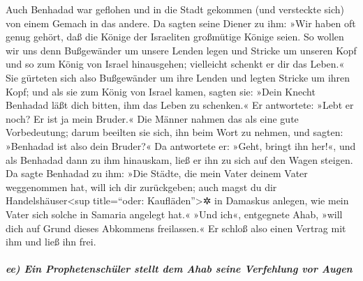 Auch Benhadad war geflohen und in die Stadt gekommen (und versteckte
sich) von einem Gemach in das andere. Da sagten seine
Diener zu ihm: »Wir haben oft genug gehört, daß die Könige der
Israeliten großmütige Könige seien. So wollen wir uns denn Bußgewänder
um unsere Lenden legen und Stricke um unseren Kopf und so zum König von
Israel hinausgehen; vielleicht schenkt er dir das Leben.«
Sie gürteten sich also Bußgewänder um ihre Lenden und
legten Stricke um ihren Kopf; und als sie zum König von Israel kamen,
sagten sie: »Dein Knecht Benhadad läßt dich bitten, ihm das Leben zu
schenken.« Er antwortete: »Lebt er noch? Er ist ja mein Bruder.«
Die Männer nahmen das als eine gute Vorbedeutung; darum
beeilten sie sich, ihn beim Wort zu nehmen, und sagten: »Benhadad ist
also dein Bruder?« Da antwortete er: »Geht, bringt ihn her!«, und als
Benhadad dann zu ihm hinauskam, ließ er ihn zu sich auf den Wagen
steigen. Da sagte Benhadad zu ihm: »Die Städte, die mein
Vater deinem Vater weggenommen hat, will ich dir zurückgeben; auch magst
du dir Handelshäuser\textless sup title=``oder: Kaufläden''\textgreater✲
in Damaskus anlegen, wie mein Vater sich solche in Samaria angelegt
hat.« »Und ich«, entgegnete Ahab, »will dich auf Grund dieses Abkommens
freilassen.« Er schloß also einen Vertrag mit ihm und ließ ihn frei.

\hypertarget{ee-ein-prophetenschuxfcler-stellt-dem-ahab-seine-verfehlung-vor-augen}{%
\subparagraph{ee) Ein Prophetenschüler stellt dem Ahab seine Verfehlung
vor
Augen}\label{ee-ein-prophetenschuxfcler-stellt-dem-ahab-seine-verfehlung-vor-augen}}

